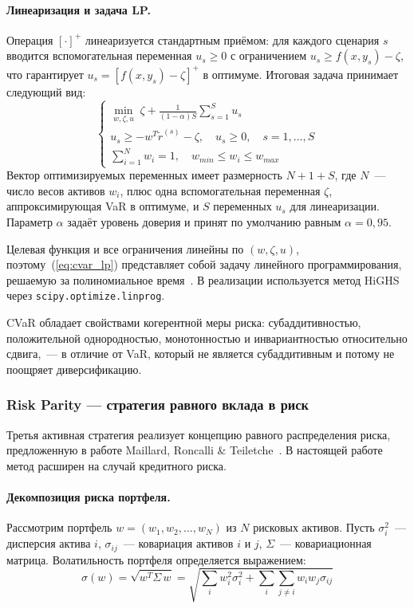 \documentclass[]{article}
\begin{document}
	\paragraph{Линеаризация и задача LP.}
	Операция $[\cdot]^+$ линеаризуется стандартным приёмом: для каждого сценария $s$ вводится
	вспомогательная переменная $u_s \geq 0$ с ограничением $u_s \geq f(x, y_s) - \zeta$,
	что гарантирует $u_s = [f(x, y_s) - \zeta]^+$ в оптимуме. Итоговая задача принимает
	следующий вид:
	\begin{equation}
		\label{eq:cvar_lp}
		\begin{cases}
			\displaystyle \min_{w, \zeta, u} \; \zeta + \frac{1}{(1-\alpha) S} \sum_{s=1}^{S} u_s \\[6pt]
			u_s \geq -w^T \tilde{r}^{(s)} - \zeta, \quad u_s \geq 0, \quad s = 1, \dots, S \\[3pt]
			\sum_{i=1}^N w_i = 1, \quad w_{min} \leq w_i \leq w_{max}
		\end{cases}
	\end{equation}
	Вектор оптимизируемых переменных имеет размерность $N + 1 + S$, где $N$~--- число весов активов
	$w_i$, плюс одна вспомогательная переменная $\zeta$, аппроксимирующая VaR в оптимуме, и $S$
	переменных $u_s$ для линеаризации. Параметр $\alpha$ задаёт уровень доверия и принят по
	умолчанию равным $\alpha = 0{,}95$.

	Целевая функция и все ограничения линейны по $(w, \zeta, u)$, поэтому~(\ref{eq:cvar_lp})
	представляет собой задачу линейного программирования, решаемую за полиномиальное
	время~\cite{rockafellar2000}. В реализации используется метод HiGHS через
	\texttt{scipy.optimize.linprog}.

	CVaR обладает свойствами когерентной меры риска: субаддитивностью, положительной однородностью,
	монотонностью и инвариантностью относительно сдвига,~--- в отличие от VaR, который
	не является субаддитивным и потому не поощряет диверсификацию.

	\subsubsection{Risk Parity --- стратегия равного вклада в риск}

	Третья активная стратегия реализует концепцию равного распределения риска, предложенную в работе
	Maillard, Roncalli \& Teiletche~\cite{maillard2010}. В настоящей работе метод расширен на случай
	кредитного риска.

	\paragraph{Декомпозиция риска портфеля.}
	Рассмотрим портфель $w = (w_1, w_2, \ldots, w_N)$ из $N$ рисковых активов. Пусть $\sigma_i^2$~---
	дисперсия актива $i$, $\sigma_{ij}$~--- ковариация активов $i$ и $j$, $\Sigma$~--- ковариационная
	матрица. Волатильность портфеля определяется выражением:
	\begin{equation}
		\label{eq:port_vol}
		\sigma(w) = \sqrt{w^T \Sigma\, w} = \sqrt{\sum_i w_i^2 \sigma_i^2 + \sum_i \sum_{j \neq i} w_i w_j \sigma_{ij}}
	\end{equation}
\end{document}

